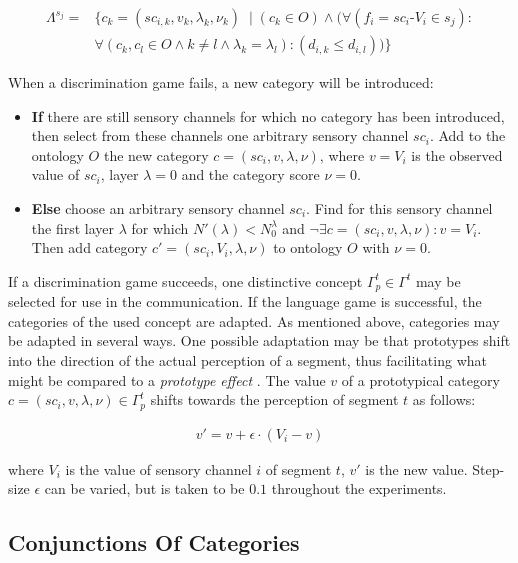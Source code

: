 \begin{eqnarray}
\Lambda^{s_j}=&\{c_k=(sc_{i,k},v_k,\lambda_k,\nu_k)\; \mid (c_k \in O) \wedge (\forall (f_i=sc_i\mbox{-}V_i \in s_j):\\ \nonumber
& \forall (c_k,c_l \in O \wedge k \neq l \wedge \lambda_k = \lambda_l): (d_{i,k} \leq d_{i,l}))\}
\label{e:cm:proto}
\end{eqnarray}


When a discrimination game fails, a new category will be introduced:

\begin{itemize}
\item {\bf If} there are still sensory channels for which no category has been introduced, then select from these channels one arbitrary sensory channel $sc_i$. Add to the ontology $O$ the new category $c=(sc_i,v,\lambda,\nu)$, where $v=V_i$ is the observed value of $sc_i$, layer $\lambda=0$ and the category score $\nu=0$.
\item {\bf Else} choose an arbitrary sensory channel $sc_i$. Find for this sensory channel the first layer $\lambda$ for which $N'(\lambda) < N_0^\lambda$ and $\neg \exists c = (sc_i,v,\lambda,\nu): v=V_i$. Then add category $c'=(sc_i,V_i,\lambda,\nu)$ to ontology $O$ with $\nu=0$.
\end{itemize}

If a discrimination game succeeds, one distinctive concept $\Gamma^t_p \in \Gamma^t$ may be selected for use in the communication. If the language game is successful, the categories of the used concept are adapted. As mentioned above, categories may be adapted in several ways. One possible adaptation may be that prototypes shift into the direction of the actual perception of a segment, thus facilitating what might be compared to a {\em prototype effect} \cite{rosch:1978}. The value $v$ of a prototypical category $c=(sc_i,v,\lambda,\nu) \in \Gamma^t_p$ shifts towards the perception of segment $t$ as follows:

\begin{eqnarray}
v'=v+\epsilon \cdot (V_i-v)
\label{e:cm:shift}
\end{eqnarray}

\p
where $V_i$ is the value of sensory channel $i$ of segment $t$, $v'$ is the new value. Step-size $\epsilon$ can be varied, but is taken to be $0.1$ throughout the experiments.

\subsection{Conjunctions Of Categories}

